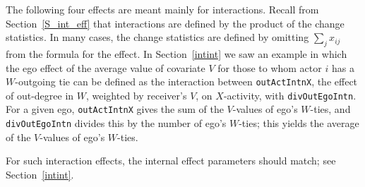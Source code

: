 \documentclass[a4paper,fleqn,11pt]{article}
\newcommand{\+}{\, + \,}
\begin{document}
The following four effects are meant mainly for interactions.
Recall from Section~\ref{S_int_eff} that interactions are defined by
the product of the change statistics.
In many cases, the change statistics are defined by omitting
$ \sum_j x_{ij}$ from the formula for the effect.
In Section~\ref{intint} we saw an example in which the ego effect of the
average value of covariate $V$ for those to whom actor $i$ has a $W$-outgoing tie
can be defined as the interaction between  \texttt{outActIntnX},
the effect of out-degree in $W$, weighted by receiver's $V$, on $X$-activity,
with  \texttt{divOutEgoIntn}. For a given ego, \texttt{outActIntnX} gives the
sum of the $V$-values of ego's $W$-ties, and \texttt{divOutEgoIntn} divides
this by the number of  ego's $W$-ties; this yields the average
of the $V$-values of ego's $W$-ties.

For such interaction effects, the internal effect parameters
should match; see Section~\ref{intint}.
\end{document}
